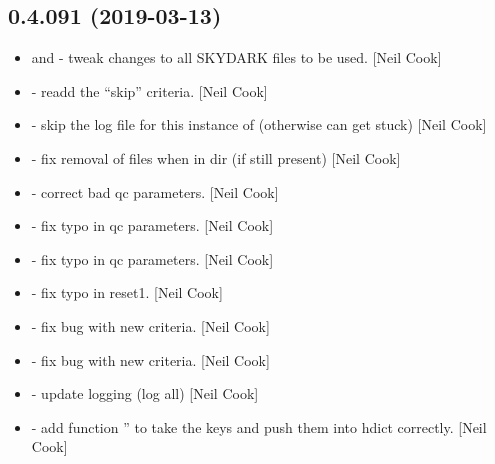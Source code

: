\documentclass[a4paper,10pt,english]{report}
\begin{document}
\subsection{0.4.091 (2019-03-13)}
\label{\detokenize{misc/changelog:id168}}\begin{itemize}
\item {} 
 and  - tweak changes to all SKYDARK
files to be used. {[}Neil Cook{]}

\item {} 
 - readd the “skip” criteria. {[}Neil Cook{]}

\item {} 
 - skip the log file for this instance of 
(otherwise can get stuck) {[}Neil Cook{]}

\item {} 
 - fix removal of files when in dir (if still present)
{[}Neil Cook{]}

\item {} 
 - correct bad qc parameters. {[}Neil Cook{]}

\item {} 
 - fix typo in qc parameters. {[}Neil Cook{]}

\item {} 
 - fix typo in qc parameters. {[}Neil Cook{]}

\item {} 
 - fix typo in reset1. {[}Neil Cook{]}

\item {} 
 - fix bug with new  criteria. {[}Neil
Cook{]}

\item {} 
 - fix bug with new  criteria. {[}Neil
Cook{]}

\item {} 
 - update logging (log all) {[}Neil Cook{]}

\item {} 
 - add function ” to take the keys and push
them into hdict correctly. {[}Neil Cook{]}


\end{itemize}
\end{document}
